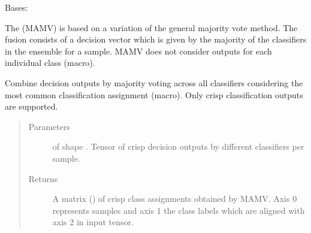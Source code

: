 \documentclass[letterpaper,10pt,english]{sphinxmanual}
\begin{document}
\begin{fulllineitems}
\label{\detokenize{pusion.core.macro_majority_vote_combiner:pusion.core.macro_majority_vote_combiner.MacroMajorityVoteCombiner}}
\sphinxAtStartPar
Bases: {\hyperref[\detokenize{pusion.core.combiner:pusion.core.combiner.UtilityBasedCombiner}]{}}

\sphinxAtStartPar
The {\hyperref[\detokenize{pusion.core.macro_majority_vote_combiner:pusion.core.macro_majority_vote_combiner.MacroMajorityVoteCombiner}]{}} (MAMV) is based on a variation of the general majority vote method.
The fusion consists of a decision vector which is given by the majority of the classifiers in the ensemble for a
sample. MAMV does not consider outputs for each individual class (macro).

\begin{fulllineitems}
\label{\detokenize{pusion.core.macro_majority_vote_combiner:pusion.core.macro_majority_vote_combiner.MacroMajorityVoteCombiner.combine}}
\sphinxAtStartPar
Combine decision outputs by majority voting across all classifiers considering the most common classification
assignment (macro). Only crisp classification outputs are supported.
\begin{quote}\begin{description}
\item[{Parameters}] \leavevmode
\sphinxAtStartPar
{} \textendash{}  of shape .
Tensor of crisp decision outputs by different classifiers per sample.

\item[{Returns}] \leavevmode
\sphinxAtStartPar
A matrix () of crisp class assignments obtained by MAMV. Axis 0 represents samples and
axis 1 the class labels which are aligned with axis 2 in  input tensor.

\end{description}\end{quote}

\end{fulllineitems}


\end{fulllineitems}
\end{document}
